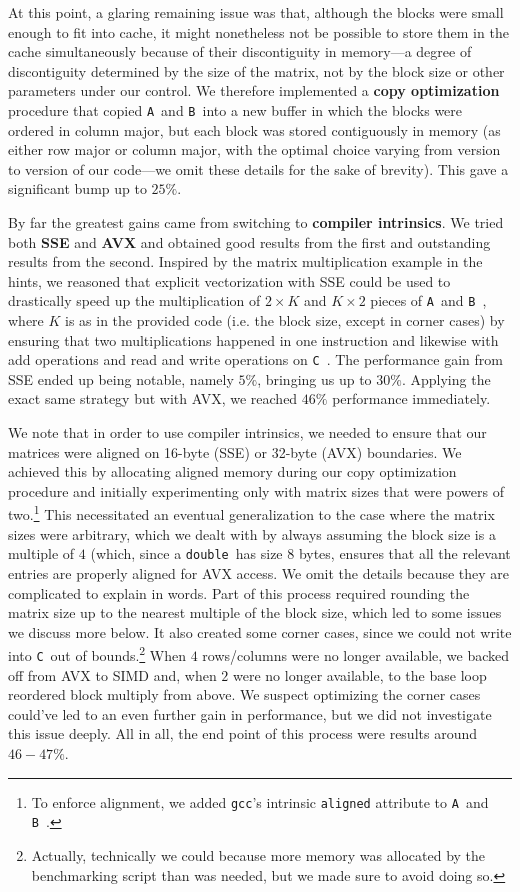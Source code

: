 \documentclass[12pt]{article}
\newcommand{\gcc}{\texttt{gcc}}
\newcommand{\double}{\texttt{double}~}
\newcommand{\A}{\texttt{A}~}
\newcommand{\B}{\texttt{B}~}
\newcommand{\C}{\texttt{C}~}
\begin{document}
At this point, a glaring remaining issue was that, although the blocks were small enough to fit into cache, it might nonetheless not be possible to store them in the
cache simultaneously because of their discontiguity in memory---a degree of discontiguity determined by the size of the matrix, not by the block size or other parameters under our control. We therefore implemented a {\bf copy optimization} procedure that copied \A and \B into a new buffer in which the blocks were
ordered in column major, but each block was stored contiguously in memory (as either row major or column major, with the optimal choice varying from version to version of our code---we omit these details for the sake of brevity). This gave a significant bump up to $25\%$.

By far the greatest gains came from switching to {\bf compiler intrinsics}. We tried both {\bf SSE} and {\bf AVX} and obtained good results from the first and
outstanding results from the second. Inspired by the matrix multiplication example in the hints, we reasoned that explicit vectorization with SSE could be used to drastically speed up the multiplication of 
$2 \times K$ and $K \times 2$ pieces of \A and \B, where $K$ is as in the provided code (i.e. the block size, except in corner cases) by ensuring that two multiplications happened in one instruction and 
likewise with add operations and read and write operations on \C. The performance gain from SSE ended up being notable, namely $5\%$, bringing us up to $30\%$. Applying the exact same strategy but with AVX,
we reached $46\%$ performance immediately.

We note that in order to use compiler intrinsics, we needed to ensure that our matrices were aligned on 16-byte (SSE) or 32-byte (AVX) boundaries. We achieved this by allocating aligned memory during our copy optimization procedure and initially experimenting
only with matrix sizes that were powers of two.\footnote{To enforce alignment, we added \gcc's intrinsic \texttt{aligned} attribute to \A and \B.} 
This necessitated an eventual generalization to the case where the matrix sizes were arbitrary, which we dealt with by always assuming the block size is a multiple of $4$ (which, since a \double has size 8 bytes, ensures
that all the relevant entries are properly aligned for AVX access. We omit the details because they are complicated to explain in words. Part of this process required rounding the matrix size up to the nearest multiple of the block size, which led to some issues we discuss more below.
It also created some corner cases, since we could not write into \C out of bounds.\footnote{Actually, technically we could because more memory was allocated by the benchmarking script than was needed, but we made sure to avoid doing so.} When $4$ rows/columns were no longer available,
we backed off from AVX to SIMD and, when $2$ were no longer available, to the base loop reordered block multiply from above. We suspect optimizing the corner cases could've led to an even further gain in performance, but we did not investigate this issue deeply. All in all, the end point of this process
were results around $46-47\%$.
\end{document}
